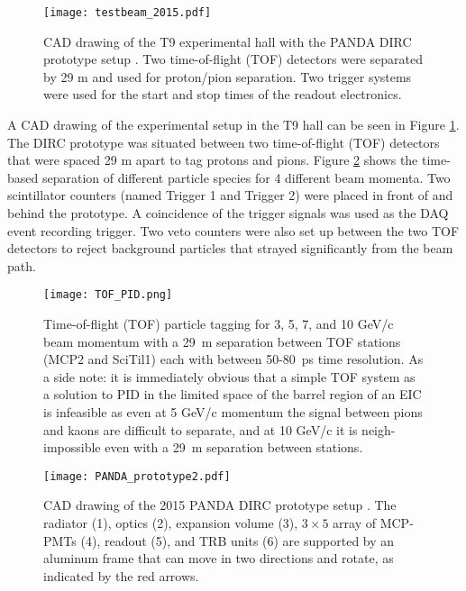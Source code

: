 \begin{figure}[!htb]
	\centering
	\texttt{[image: testbeam\_2015.pdf]}
	\caption[CAD drawing of the T9 experimental hall with the PANDA DIRC prototype setup.]{CAD drawing of the T9 experimental hall with the PANDA DIRC prototype setup \cite{PANDA_barrel}. Two time-of-flight (TOF) detectors were separated by 29 m and used for proton/pion separation. Two trigger systems were used for the start and stop times of the readout electronics.}
	\label{fig:testbeam_2015}
\end{figure}

A CAD drawing of the experimental setup in the T9 hall can be seen in Figure \ref{fig:testbeam_2015}. The DIRC prototype was situated between two time-of-flight (TOF) detectors that were spaced 29 m apart to tag protons and pions. Figure \ref{fig:TOF_PID} shows the time-based separation of different particle species for 4 different beam momenta. Two scintillator counters (named Trigger 1 and Trigger 2) were placed in front of and behind the prototype. A coincidence of the trigger signals was used as the DAQ event recording trigger. Two veto counters were also set up between the two TOF detectors to reject background particles that strayed significantly from the beam path.

\begin{figure}[!htb]
	\centering
	\texttt{[image: TOF\_PID.png]}
	\caption[Time-of-flight (TOF) particle tagging for 3, 5, 7, and 10 GeV/c beam momentum with a 29~m separation between TOF stations (MCP2 and SciTil1) each with between 50-80~ps time resolution.]{Time-of-flight (TOF) particle tagging for 3, 5, 7, and 10 GeV/c beam momentum with a 29~m separation between TOF stations (MCP2 and SciTil1) each with between 50-80~ps time resolution. As a side note: it is immediately obvious that a simple TOF system as a solution to PID in the limited space of the barrel region of an EIC is infeasible as even at 5 GeV/c momentum the signal between pions and kaons are difficult to separate, and at 10 GeV/c it is neigh-impossible even with a 29~m separation between stations. }
	\label{fig:TOF_PID}
\end{figure}

\begin{figure}[!htb]
	\centering
	\texttt{[image: PANDA\_prototype2.pdf]}
	\caption[CAD drawing of the 2015 PANDA DIRC prototype setup.]{CAD drawing of the 2015 PANDA DIRC prototype setup \cite{PrototypeInfo}. The radiator (1), optics (2), expansion volume (3), $3\times5$ array of MCP-PMTs (4), readout (5), and TRB units (6) are supported by an aluminum frame that can move in two directions and rotate, as indicated by the red arrows.}
	\label{fig:PANDA_prototype}
\end{figure}

